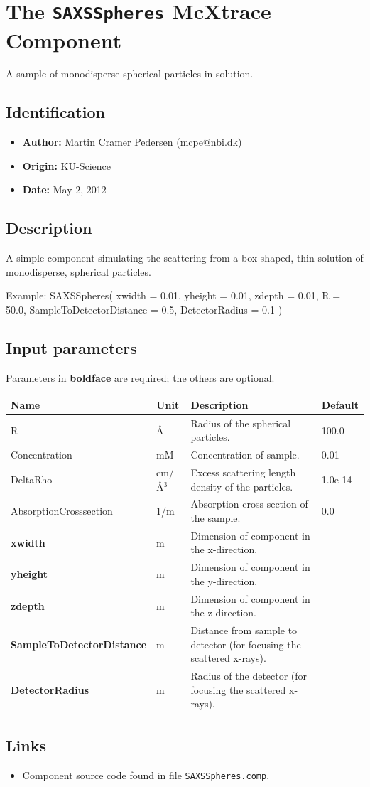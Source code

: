 \section{The \texttt{SAXSSpheres} McXtrace Component}
A sample of monodisperse spherical particles in solution.

\subsection*{Identification}
\begin{itemize}
  \item \textbf{Author:} Martin Cramer Pedersen (mcpe@nbi.dk)
  \item \textbf{Origin:} KU-Science
  \item \textbf{Date:} May 2, 2012
\end{itemize}

\subsection*{Description}
A simple component simulating the scattering from a box-shaped, thin solution of monodisperse, spherical particles.

Example: SAXSSpheres( xwidth = 0.01, yheight = 0.01, zdepth = 0.01, R = 50.0, SampleToDetectorDistance = 0.5, DetectorRadius = 0.1 )

\subsection*{Input parameters}
Parameters in \textbf{boldface} are required; the others are optional.

\begin{longtable}{p{}p{}p{}p{}}
\toprule
\textbf{Name} & \textbf{Unit} & \textbf{Description} & \textbf{Default} \\
\midrule
\endhead
R & \AA{} & Radius of the spherical particles. & 100.0 \\
Concentration & mM & Concentration of sample. & 0.01 \\
DeltaRho & cm/\AA{}$^{3}$ & Excess scattering length density of the particles. & 1.0e-14 \\
AbsorptionCrosssection & 1/m & Absorption cross section of the sample. & 0.0 \\
\textbf{xwidth} & m & Dimension of component in the x-direction. &  \\
\textbf{yheight} & m & Dimension of component in the y-direction. &  \\
\textbf{zdepth} & m & Dimension of component in the z-direction. &  \\
\textbf{SampleToDetectorDistance} & m & Distance from sample to detector (for focusing the scattered x-rays). &  \\
\textbf{DetectorRadius} & m & Radius of the detector (for focusing the scattered x-rays). &  \\
\bottomrule
\end{longtable}

\subsection*{Links}
\begin{itemize}
  \item Component source code found in file \texttt{SAXSSpheres.comp}.
\end{itemize}
